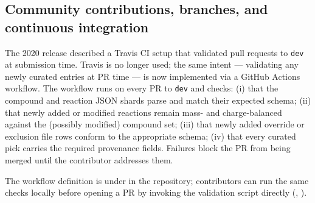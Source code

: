 \subsection{Community contributions, branches, and continuous integration}

The 2020 release described a Travis CI setup that validated pull requests to
\texttt{dev} at submission time. Travis is no longer used; the same intent ---
validating any newly curated entries at PR time --- is now implemented via a
GitHub Actions workflow. The workflow runs on every PR to \texttt{dev} and
checks: (i) that the compound and reaction JSON shards parse and match their
expected schema; (ii) that newly added or modified reactions remain mass- and
charge-balanced against the (possibly modified) compound set; (iii) that newly
added override or exclusion file rows conform to the appropriate schema; (iv)
that every curated pick carries the required provenance fields. Failures block
the PR from being merged until the contributor addresses them.

The workflow definition is under  in the repository;
contributors can run the same checks locally before opening a PR by invoking the
validation script directly (,
).
